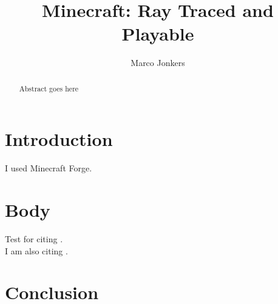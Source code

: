 \documentclass[]{article}
\title{Minecraft: Ray Traced and Playable}
\author{Marco Jonkers}
\begin{document}
\maketitle

\begin{abstract}
Abstract goes here
\end{abstract}

\section{Introduction}
I used Minecraft Forge.

\section{Body}
Test for citing \cite{amanatides1987fast}.
\\
I am also citing \cite{ivson2009gpu}.

\section{Conclusion}

{}

\end{document}
